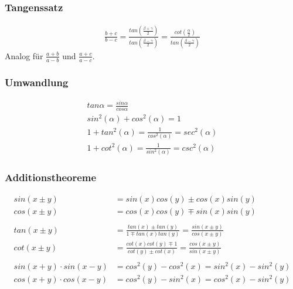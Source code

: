 \documentclass[12pt,a4paper]{article}%
\numberwithin{equation}{section}
\numberwithin{equation}{subsection}
\begin{document}
	  \subsubsection{Tangenssatz}
	  \begin{align}
	    \frac{b + c}{b - c} = \frac{tan\left(\frac{\beta + \gamma}{2}\right)}{tan\left(\frac{\beta - \gamma}{2}\right)} 
	    = \frac{cot\left(\frac{\alpha}{2} \right)}{tan\left(\frac{\beta - \gamma}{2}\right)}
	  \end{align}
	  Analog für $\frac{a + b}{a - b}$ und $\frac{a + c}{a - c}$.\label{eq:trigo_tangenssatz}
	  
	  \subsubsection{Umwandlung}
	  \begin{align}
	    tan\alpha = \frac{sin\alpha}{cos\alpha}\\
	    sin^2(\alpha) + cos^2(\alpha) = 1\\
	    1 + tan^2(\alpha) = \frac{1}{cos^2(\alpha)} = sec^2(\alpha)\\
	    1 + cot^2(\alpha) = \frac{1}{sin^2(\alpha)} = csc^2(\alpha)\label{eq:trigo_umwandlung}
	  \end{align}
	  
	  \subsubsection{Additionstheoreme}
	  \begin{align}
	    sin(x \pm y) &= sin(x) cos(y) \pm cos(x) sin(y)\\
	    cos(x \pm y) &= cos(x) cos(y) \mp sin(x) sin(y)\\\\
	    tan(x \pm y) &= \frac{tan(x) \pm tan(y)}{1 \mp tan(x) tan(y)} = \frac{sin(x \pm y)}{cos(x \pm y)}\\
	    cot(x \pm y) &= \frac{cot(x) cot(y) \mp 1}{cot(y) \pm cot(x)} = \frac{cos(x \pm y)}{sin(x \pm y)}\\\\
	    sin(x + y) \cdot sin(x - y) &= cos^2(y) - cos^2(x) = sin^2(x) - sin^2(y)\\
	    cos(x + y) \cdot cos(x - y) &= cos^2(y) - sin^2(x) = cos^2(x) - sin^2(y)\label{eq:trigo_addtheo}
	  \end{align}
	  
\end{document}
